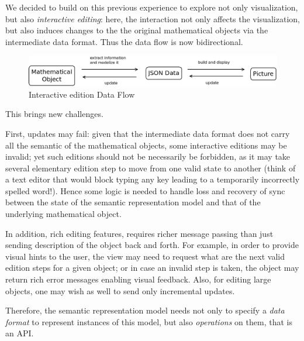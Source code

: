 \documentclass{deliverablereport}
\begin{document}
We decided to build on this previous experience to explore not only
visualization, but also \emph{interactive editing}: here, the interaction
not only affects the visualization, but also induces changes to the
the original mathematical objects via the intermediate data format.
Thus the data flow is now bidirectional.

\begin{figure}[h]
  \begin{center}
    \includegraphics[width=\textwidth]{schemas/DoubleSens}
  \end{center}
  \caption{Interactive edition Data Flow}
  \label{fig:dataflow1}
\end{figure}

This brings new challenges.
%

First, updates may fail: given that the intermediate data format does not
carry all the semantic of the mathematical objects, some interactive
editions may be invalid; yet such editions should not be necessarily
be forbidden, as it may take several elementary edition step to move
from one valid state to another (think of a text editor that would
block typing any key leading to a temporarily incorrectly spelled word!). Hence
some logic is needed to handle loss and recovery of sync between the
state of the semantic representation model and that of the
underlying mathematical object.

In addition, rich editing features, requires richer message passing
than just sending description of the object back and forth. For
example, in order to provide visual hints to the user, the view may
need to request what are the next valid edition steps for a given
object; or in case an invalid step is taken, the object may return
rich error messages enabling visual feedback. Also, for editing large
objects, one may wish as well to send only incremental updates.

Therefore, the semantic representation model needs not only to specify
a \emph{data format} to represent instances of this model, but also
\emph{operations} on them, that is an API.
\end{document}
